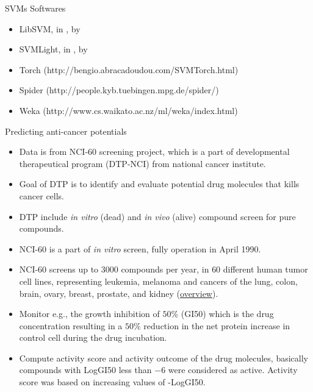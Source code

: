 \documentclass[first=dgreen,second=purple,logo=yellowexc]{aaltoslides}
\begin{document}
{\begin{frame}{SVMs Softwares}
	\begin{itemize}
		\item LibSVM, in \cpp, by \citet{Chang11libsvm}
		\item SVMLight, in \ccc, by \citet{Joachims98making}
		\item Torch (http://bengio.abracadoudou.com/SVMTorch.html)
		\item Spider (http://people.kyb.tuebingen.mpg.de/spider/)
		\item Weka (http://www.cs.waikato.ac.nz/ml/weka/index.html)
	\end{itemize}
\end{frame}

\begin{frame}{Predicting anti-cancer potentials}
	\begin{itemize}
		\item Data is from NCI-60 screening project, which is a part of developmental therapeutical program (DTP-NCI) from national cancer institute.
		\item Goal of DTP is to identify and evaluate potential drug molecules that kills cancer cells.
		\item DTP include \textit{in vitro} (dead) and \textit{in vivo} (alive) compound screen for pure compounds.
		\item NCI-60 is a part of \textit{in vitro} screen, fully operation in April 1990.
		\item NCI-60 screens up to $3000$ compounds per year, in $60$ different human tumor cell lines, representing leukemia, melanoma and cancers of the lung, colon, brain, ovary, breast, prostate, and kidney (\href{http://discover.nci.nih.gov/cellminer/celllineMetadata.do}{overview}). 
		\item Monitor e.g., the growth inhibition of $50\%$ (GI50)  which is the drug concentration resulting in a $50\%$ reduction in the net protein increase in control cell during the drug incubation.
		\item Compute activity score and activity outcome of the drug molecules, basically compounds with LogGI50 less than $-6$ were considered as active. Activity score was based on increasing values of -LogGI50.
	\end{itemize}
\end{frame}

}
\end{document}
